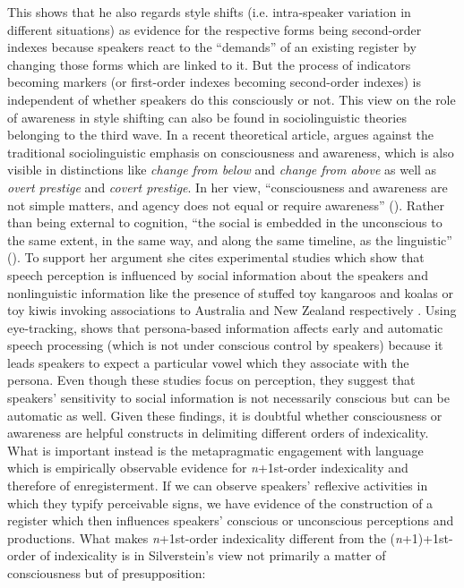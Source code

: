 This shows that he also regards style shifts (i.e. intra-speaker variation in different situations) as evidence for the respective forms being second-order indexes because speakers react to the “demands” of an existing register by changing those forms which are linked to it. But the process of indicators becoming markers (or first-order indexes becoming second-order indexes) is independent of whether speakers do this consciously or not. This view on the role of awareness in style shifting can also be found in sociolinguistic theories belonging to the third wave. In a recent theoretical article, \citet{Eckert2016} argues against the traditional sociolinguistic emphasis on consciousness and awareness, which is also visible in distinctions like \textit{change from below} and \textit{change from above} as well as \textit{overt prestige} and \textit{covert prestige}. In her view, “consciousness and awareness are not simple matters, and agency does not equal or require awareness” (\citeyear[78]{Eckert2016}). Rather than being external to cognition, “the social is embedded in the unconscious to the same extent, in the same way, and along the same timeline, as the linguistic” (\citeyear[78]{Eckert2016}). To support her argument she cites experimental studies which show that speech perception is influenced by social information about the speakers \citep{DOnofrio2015} and nonlinguistic information like the presence of stuffed toy kangaroos and koalas or toy kiwis invoking associations to Australia and New Zealand respectively \citep{Hay2010}. Using eye-tracking, \citet{DOnofrio2015} shows that persona-based information affects early and automatic speech processing (which is not under conscious control by speakers) because it leads speakers to expect a particular vowel which they associate with the persona. Even though these studies focus on perception, they suggest that speakers’ sensitivity to social information is not necessarily conscious but can be automatic as well. Given these findings, it is doubtful whether consciousness or awareness are helpful constructs in delimiting different orders of indexicality. What is important instead is the metapragmatic engagement with language which is empirically observable evidence for \emph{n}+1st-order indexicality and therefore of enregisterment. If we can observe speakers’ reflexive activities in which they typify perceivable signs, we have evidence of the construction of a register which then influences speakers’ conscious or unconscious perceptions and productions. What makes \emph{n}+1st-order indexicality different from the (\emph{n}+1)+1st-order of indexicality is in Silverstein’s view not primarily a matter of consciousness but of presupposition:


